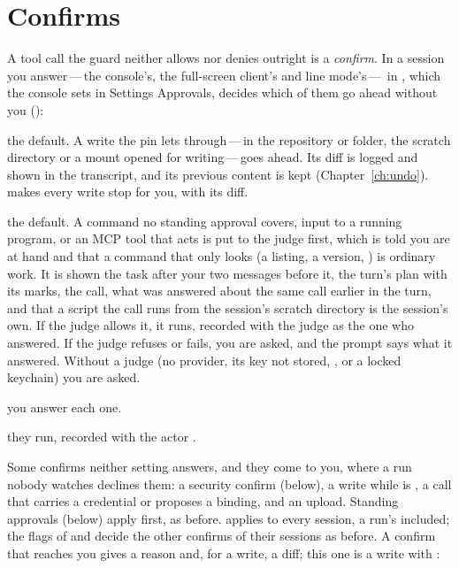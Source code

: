 \chapter{Confirms}

A tool call the guard neither allows nor denies outright is a
\emph{confirm}. In a session you answer\,---\,the console's, the
full-screen client's and line mode's\,---\,\code{[approval]} in
, which the console sets in Settings \textrightarrow{}
Approvals, decides which of them go ahead without you ():

\begin{description}[leftmargin=2.2em]
\item[\code{writes = "allow"}] the default. A write the pin lets
  through\,---\,in the repository or folder, the scratch directory or a
  mount opened for writing\,---\,goes ahead. Its diff is logged and shown
  in the transcript, and its previous content is kept
  (Chapter~\ref{ch:undo}).  makes every write stop for you,
  with its diff.
\item[\code{commands = "judge"}] the default. A command no standing
  approval covers, input to a running program, or an MCP tool that acts is
  put to the judge first, which is told you are at hand and that a command
  that only looks (a listing, a version, ) is ordinary work.
  It is shown the task after your two messages before it, the turn's plan
  with its marks, the call, what was answered about the same call earlier
  in the turn, and that a script the call runs from the session's scratch
  directory is the session's own. If the judge allows it,
  it runs, recorded with the judge as the one
  who answered. If the judge refuses or fails, you are asked, and the
  prompt says what it answered. Without a judge (no \code{[judge]}
  provider, its key not stored, , or a locked
  keychain) you are asked.
\item[\code{commands = "ask"}] you answer each one.
\item[\code{commands = "allow"}] they run, recorded with the actor
  .
\end{description}

Some confirms neither setting answers, and they come to you, where a run
nobody watches declines them: a security confirm (below), a write while
 is , a call that carries a credential or
proposes a binding, and an upload. Standing approvals (below) apply first,
as before.  applies to every session, a run's included; the
flags of  and  decide the other
confirms of their sessions as before. A confirm that reaches you gives a
reason and, for a write, a diff; this one is a write with :

